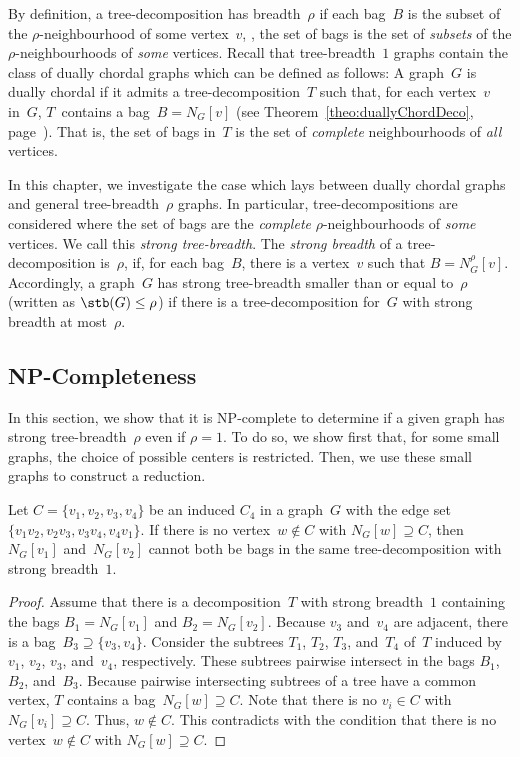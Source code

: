 
By definition, a tree-decomposition has breadth~$\rho$ if each bag~$B$ is the subset of the $\rho$-neighbourhood of some vertex~$v$, \ie, the set of bags is the set of \emph{subsets} of the $\rho$-neighbourhoods of \emph{some} vertices.
Recall that tree-breadth~$1$ graphs contain the class of dually chordal graphs which can be defined as follows:
A graph~$G$ is dually chordal if it admits a tree-decomposition~$T$ such that, for each vertex~$v$ in~$G$, $T$~contains a bag~$B = N_G[v]$ (see Theorem~\ref{theo:duallyChordDeco}, page~\pageref{theo:duallyChordDeco}).
That is, the set of bags in~$T$ is the set of \emph{complete} neighbourhoods of \emph{all} vertices.

In this chapter, we investigate the case which lays between dually chordal graphs and general tree-breadth~$\rho$ graphs.
In particular, tree-decompositions are considered where the set of bags are the \emph{complete} $\rho$-neighbourhoods of \emph{some} vertices.
We call this \emph{strong tree-breadth}.
The \emph{strong breadth} of a tree-decomposition is~$\rho$, if, for each bag~$B$, there is a vertex~$v$ such that $B = N_G^\rho[v]$.
Accordingly, a graph~$G$ has strong tree-breadth smaller than or equal to~$\rho$ (written as $\stb(G) \leq \rho$) if there is a tree-decomposition for~$G$ with strong breadth at most~$\rho$.


\subsection{NP-Completeness}

In this section, we show that it is NP-complete to determine if a given graph has strong tree-breadth~$\rho$ even if $\rho = 1$.
To do so, we show first that, for some small graphs, the choice of possible centers is restricted.
Then, we use these small graphs to construct a reduction.

\begin{lemma}
    \label{lem:C4AdjVert}
Let \( C = \{ v_1, v_2, v_3, v_4 \} \) be an induced \( C_4 \) in a graph~\( G \) with the edge set \( \{ v_1v_2, v_2v_3, v_3v_4, v_4v_1 \} \).
If there is no vertex~\( w \notin C \) with \( N_G[w] \supseteq C \), then \( N_G[v_1] \) and~\( N_G[v_2] \) cannot both be bags in the same tree-decomposition with strong breadth~\( 1 \).
\end{lemma}

\begin{proof}
Assume that there is a decomposition~$T$ with strong breadth~$1$ containing the bags $B_1 = N_G[v_1]$ and $B_2 = N_G[v_2]$.
Because $v_3$ and~$v_4$ are adjacent, there is a bag~$B_3 \supseteq \{ v_3, v_4 \}$.
Consider the subtrees $T_1$, $T_2$, $T_3$, and~$T_4$ of~$T$ induced by $v_1$, $v_2$, $v_3$, and~$v_4$, respectively.
These subtrees pairwise intersect in the bags $B_1$, $B_2$, and~$B_3$.
Because pairwise intersecting subtrees of a tree have a common vertex, $T$ contains a bag~$N_G[w] \supseteq C$.
Note that there is no $v_i \in C$ with $N_G[v_i] \supseteq C$.
Thus, $w \notin C$.
This contradicts with the condition that there is no vertex~$w \notin C$ with $N_G[w] \supseteq C$.
\end{proof}

